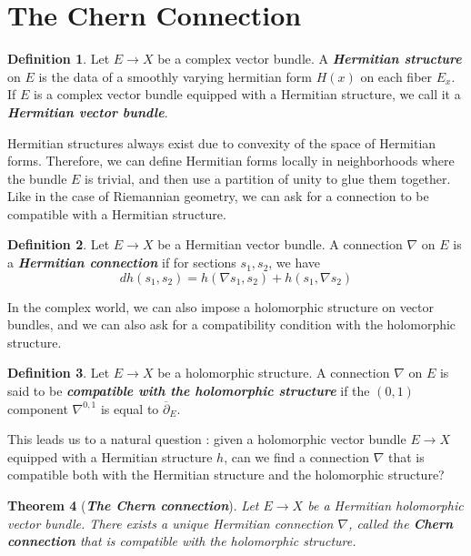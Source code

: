 \documentclass[psamsfonts, 12pt]{amsart}
\newtheorem{thm}{Theorem}[section]
\theoremstyle{definition}
\newtheorem{defn}[thm]{Definition}
\theoremstyle{remark}
\newcommand{\ib}[1]{\textbf{\textit{#1}}}
\newcommand{\dbar}{\overline{\partial}}
\begin{document}
\section{The Chern Connection}
%
\begin{defn}
Let $E \to X$ be a complex vector bundle. A \ib{Hermitian structure} on $E$
is the data of a smoothly varying hermitian form $H(x)$ on each fiber $E_x$.
If $E$ is a complex vector bundle equipped with a Hermitian structure, we call it
a \ib{Hermitian vector bundle}.
\end{defn}
%
Hermitian structures always exist due to convexity of the space of Hermitian forms.
Therefore, we can define Hermitian forms locally in neighborhoods where the bundle
$E$ is trivial, and then use a partition of unity to glue them together.
%
Like in the case of Riemannian geometry, we can ask for a connection to be compatible
with a Hermitian structure.
%
\begin{defn}
Let $E \to X$ be a Hermitian vector bundle. A connection $\nabla$ on $E$ is a
\ib{Hermitian connection} if for sections $s_1, s_2$, we have
\[
dh(s_1,s_2) = h(\nabla s_1, s_2) + h(s_1,\nabla s_2)
\]
\end{defn}
%
In the complex world, we can also impose a holomorphic structure on vector bundles,
and we can also ask for a compatibility condition with the holomorphic structure.
%
\begin{defn}
Let $E \to X$ be a holomorphic structure. A connection $\nabla$ on $E$ is said
to be \ib{compatible with the holomorphic structure} if the $(0,1)$ component
$\nabla^{0,1}$ is equal to $\dbar_E$.
\end{defn}
%
This leads us to a natural question : given a holomorphic vector bundle $E \to X$
equipped with a Hermitian structure $h$, can we find a connection $\nabla$ that
is compatible both with the Hermitian structure and the holomorphic structure?
%
\begin{thm}[\ib{The Chern connection}]
Let $E \to X$ be a Hermitian holomorphic vector bundle. There exists a unique
Hermitian connection $\nabla$, called the \ib{Chern connection} that is compatible
with the holomorphic structure.
\end{thm}
%
\end{document}
